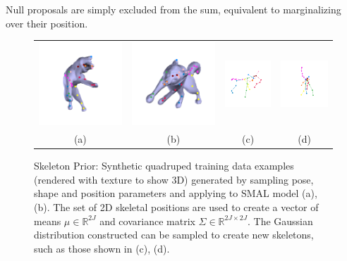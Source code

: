 Null proposals are simply excluded from the sum, equivalent to marginalizing over their position. 


\begin{figure}[t]
\def\bb{\rule{2in}{0pt}\rule{0pt}{1in}}
\begin{tabular}{cccc}
\includegraphics[width=0.25\linewidth]{skeletal_prior_gen/63_rgb.png} & \includegraphics[width=0.25\linewidth]{skeletal_prior_gen/36_rgb.png} & \includegraphics[width=0.25\linewidth]{skeletal_prior/74.png} & \includegraphics[width=0.25\linewidth]{skeletal_prior/108.png} \\
(a) & (b) & (c) & (d) \\
\end{tabular}
\caption{Skeleton Prior: Synthetic quadruped training data examples (rendered with texture to show 3D) generated by sampling pose, shape and position parameters and applying to SMAL model (a), (b). The set of 2D skeletal positions are used to create a vector of means $\mu \in \mathbb{R}^{2J}$ and covariance matrix $\Sigma \in \mathbb{R}^{2J \times 2J}$. The Gaussian distribution constructed can be sampled to create new skeletons, such as those shown in (c), (d).}
\label{fig:skeleton-prior}
\end{figure} 

